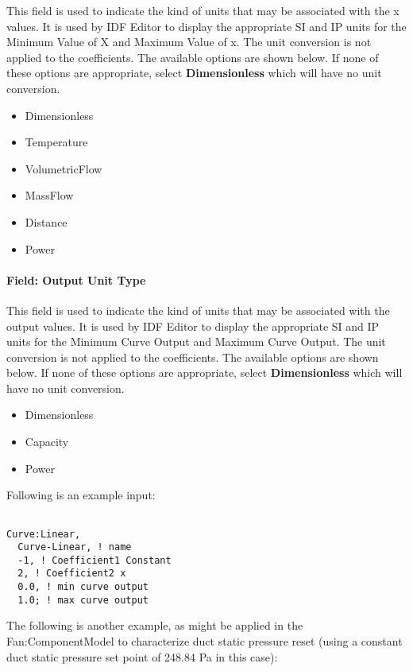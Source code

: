 This field is used to indicate the kind of units that may be associated with the x values. It is used by IDF Editor to display the appropriate SI and IP units for the Minimum Value of X and Maximum Value of x. The unit conversion is not applied to the coefficients. The available options are shown below. If none of these options are appropriate, select \textbf{Dimensionless} which will have no unit conversion.

\begin{itemize}
\item
  Dimensionless
\item
  Temperature
\item
  VolumetricFlow
\item
  MassFlow
\item
  Distance
\item
  Power
\end{itemize}

\paragraph{Field: Output Unit Type}\label{field-output-unit-type}

This field is used to indicate the kind of units that may be associated with the output values. It is used by IDF Editor to display the appropriate SI and IP units for the Minimum Curve Output and Maximum Curve Output. The unit conversion is not applied to the coefficients. The available options are shown below. If none of these options are appropriate, select \textbf{Dimensionless} which will have no unit conversion.

\begin{itemize}
\item
  Dimensionless
\item
  Capacity
\item
  Power
\end{itemize}

Following is an example input:

\begin{lstlisting}

Curve:Linear,
  Curve-Linear, ! name
  -1, ! Coefficient1 Constant
  2, ! Coefficient2 x
  0.0, ! min curve output
  1.0; ! max curve output
\end{lstlisting}

The following is another example, as might be applied in the Fan:ComponentModel to characterize duct static pressure reset (using a constant duct static pressure set point of 248.84 Pa in this case):

